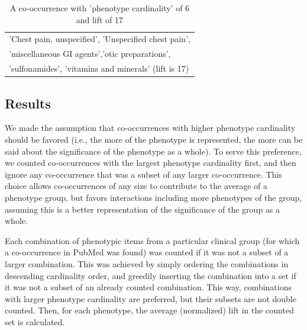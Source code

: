 \documentclass{sig-alternate-05-2015}
\newcommand{\kibitz}[2]{\ifnum\Comments=1\textcolor{#1}{#2}\fi}
\newcommand{\joyce}[1]{\kibitz{purple}      {[Joyce: #1]}}
\newcommand{\jette}[1]{\kibitz{red}      {[Jette: #1]}}
\begin{document}

\begin{table}
\begin{center}
\begin{tabular}{l}
\toprule
'Chest pain, unspecified', 'Unspecified chest pain',\\
 'miscellaneous GI agents','otic preparations',\\
 'sulfonamides', 'vitamins and minerals' (lift is 17) \\
\bottomrule
\end{tabular}
\end{center}
\caption{A co-occurrence with 'phenotype cardinality' of 6 and lift of 17}
\label{tab:phenoCard}
\end{table}

\subsection{Results}

We made the assumption that co-occurrences with higher phenotype cardinality should be favored (i.e., the more of the phenotype is represented, the more can be said about the significance of the phenotype as a whole). 
To serve this preference, we counted co-occurrences with the largest phenotype cardinality first, and then ignore any co-occurrence that was a subset of any larger co-occurrence. 
This choice allows co-occurrences of any size to contribute to the average of a phenotype group, but favors interactions including more phenotypes of the group, assuming this is a better representation of the significance of the group as a whole.

Each combination of phenotypic items from a particular clinical group (for which a co-occurrence in PubMed was found) was counted if it was not a subset of a larger combination. This was achieved by simply ordering the combinations in descending cardinality order, and greedily inserting the combination into a set if it was not a subset of an already counted combination. This way, combinations with larger phenotype cardinality are preferred, but their subsets are not double counted. Then, for each phenotype, the average (normalized) lift in the counted set is calculated.
\end{document}

